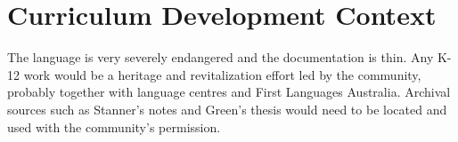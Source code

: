 \documentclass[12pt]{article}
\begin{document}
\section{Curriculum Development Context}
The language is very severely endangered and the documentation is thin. Any K-12 work would be a heritage and revitalization effort led by the community, probably together with language centres and First Languages Australia. Archival sources such as Stanner's notes and Green's thesis would need to be located and used with the community's permission.
\end{document}

